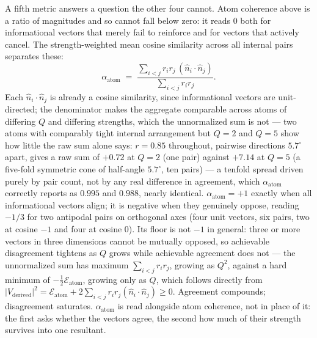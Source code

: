 \documentclass[12pt, a4paper]{article}
\begin{document}
A fifth metric answers a question the other four cannot. Atom
coherence above is a ratio of magnitudes and so cannot fall below
zero: it reads $0$ both for informational vectors that merely fail
to reinforce and for vectors that actively cancel. The
strength-weighted mean cosine similarity across all internal pairs
separates these:
\begin{equation}
    \alpha_{\text{atom}} \;=\;
    \frac{\sum_{i<j} r_i r_j\,(\hat n_i\cdot\hat n_j)}
         {\sum_{i<j} r_i r_j}.
    \label{eq:internal_alignment}
\end{equation}
Each $\hat n_i\cdot\hat n_j$ is already a cosine similarity, since
informational vectors are unit-directed; the denominator makes the
aggregate comparable across atoms of differing $Q$ and differing
strengths, which the unnormalized sum is not --- two atoms with
comparably tight internal arrangement but $Q=2$ and $Q=5$ show how
little the raw sum alone says: $r=0.85$ throughout, pairwise
directions $5.7^\circ$ apart, gives a raw sum of $+0.72$ at $Q=2$
(one pair) against $+7.14$ at $Q=5$ (a five-fold symmetric cone of
half-angle $5.7^\circ$, ten pairs) --- a tenfold spread driven purely by
pair count, not by any real difference in agreement, which
$\alpha_{\text{atom}}$ correctly reports as $0.995$ and $0.988$,
nearly identical. $\alpha_{\text{atom}}=+1$ exactly when all
informational vectors align; it is negative when they genuinely
oppose, reading $-1/3$ for two antipodal pairs on orthogonal axes
(four unit vectors, six pairs, two at cosine $-1$ and four at
cosine $0$). Its floor is not $-1$ in general: three
or more vectors in three dimensions cannot be mutually opposed, so
achievable disagreement tightens as $Q$ grows while achievable
agreement does not --- the unnormalized sum has maximum
$\sum_{i<j}r_ir_j$, growing as $Q^2$, against a hard minimum of
$-\tfrac{1}{2}\mathcal{E}_{\text{atom}}$, growing only as $Q$, which
follows directly from $\lvert V_{\text{derived}}\rvert^2 =
\mathcal{E}_{\text{atom}} + 2\sum_{i<j} r_ir_j(\hat n_i\cdot\hat n_j)
\ge 0$. Agreement compounds; disagreement saturates.
$\alpha_{\text{atom}}$ is read alongside atom coherence, not in place
of it: the first asks whether the vectors agree, the second how much
of their strength survives into one resultant.
\end{document}
